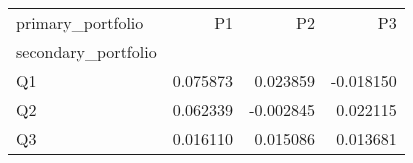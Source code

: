 \begin{tabular}{lrrr}
\toprule
primary_portfolio & P1 & P2 & P3 \\
secondary_portfolio &  &  &  \\
\midrule
Q1 & 0.075873 & 0.023859 & -0.018150 \\
Q2 & 0.062339 & -0.002845 & 0.022115 \\
Q3 & 0.016110 & 0.015086 & 0.013681 \\
\bottomrule
\end{tabular}
